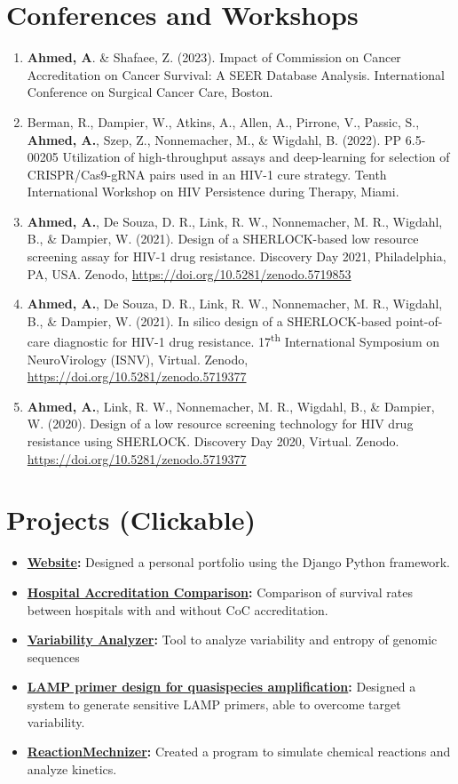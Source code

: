 \documentclass[letterpaper,11pt]{article}
\newcommand{\resumeItem}[2]{
  \item\small{
    \textbf{#1}{ #2 \vspace{-2pt}}
  }
}
\newcommand{\resumeSubItem}[2]{\resumeItem{#1}{#2}\vspace{-4pt}}
\newcommand{\resumeSubHeadingListStart}{\begin{itemize}[leftmargin=*]}
\newcommand{\resumeSubHeadingListEnd}{\end{itemize}}
\begin{document}
\section{Conferences and Workshops}
  \begin{enumerate}[leftmargin=*]
  \resumeSubItem{}
    {\textbf{Ahmed, A}. \& Shafaee, Z. (2023). Impact of Commission on Cancer Accreditation on Cancer Survival: A SEER Database Analysis. International Conference on Surgical Cancer Care, Boston.}
  \resumeSubItem{}
    {Berman, R., Dampier, W., Atkins, A., Allen, A., Pirrone, V., Passic, S., \textbf{Ahmed, A.}, Szep, Z., Nonnemacher, M., \& Wigdahl, B. (2022). PP 6.5-00205 Utilization of high-throughput assays and deep-learning for selection of CRISPR/Cas9-gRNA pairs used in an HIV-1 cure strategy. Tenth International Workshop on HIV Persistence during Therapy, Miami.}
  \resumeSubItem{}
    {\textbf{Ahmed, A.}, De Souza, D. R., Link, R. W., Nonnemacher, M. R., Wigdahl, B., \& Dampier, W. (2021). Design of a SHERLOCK-based low resource screening assay for HIV-1 drug resistance. Discovery Day 2021, Philadelphia, PA, USA. Zenodo, \href{https://doi.org/10.5281/zenodo.5719853}{https://doi.org/10.5281/zenodo.5719853}}
  \resumeSubItem{}
    {\textbf{Ahmed, A.}, De Souza, D. R., Link, R. W., Nonnemacher, M. R., Wigdahl, B., \& Dampier, W. (2021). In silico design of a SHERLOCK-based point-of-care diagnostic for HIV-1 drug resistance. 17\textsuperscript{th} International Symposium on NeuroVirology (ISNV), Virtual. Zenodo, \href{https://doi.org/10.5281/zenodo.5719377}{https://doi.org/10.5281/zenodo.5719377}}
  \resumeSubItem{}{\textbf{Ahmed, A.}, Link, R. W., Nonnemacher, M. R., Wigdahl, B., \& Dampier, W. (2020). Design of a low resource screening technology for HIV drug resistance using SHERLOCK. Discovery Day 2020, Virtual. Zenodo. \href{https://doi.org/10.5281/zenodo.5719377}{https://doi.org/10.5281/zenodo.5719377}}
  \end{enumerate}

\section{Projects (Clickable)}
  \resumeSubHeadingListStart
    \resumeSubItem{\href{https://ahmed.science}{Website}:}
      {Designed a personal portfolio using the Django Python framework.}
    \resumeSubItem{\href{https://github.com/ArmaanAhmed22/CompareCoCversusNonCoC}{Hospital Accreditation Comparison}:}
      {Comparison of survival rates between hospitals with and without CoC accreditation.}
    \resumeSubItem{\href{https://github.com/ArmaanAhmed22/VariabilityAnalyzer}{Variability Analyzer}:}
      {Tool to analyze variability and entropy of genomic sequences}
    \resumeSubItem{\href{https://github.com/ArmaanAhmed22/NonSpecificLAMPDesign}{LAMP primer design for quasispecies amplification}:}
      {Designed a system to generate sensitive LAMP primers, able to overcome target variability.}
    \resumeSubItem{\href{https://github.com/ArmaanAhmed22/ReactionMechanizer}{ReactionMechnizer}:}
      {Created a program to simulate chemical reactions and analyze kinetics.}
  \resumeSubHeadingListEnd
\end{document}
